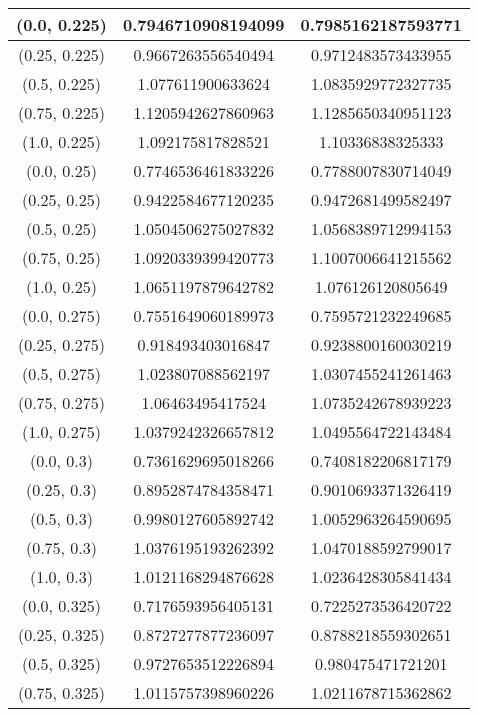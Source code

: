 \begin{table}[H]
\begin{tabular}{|c|c|c|}
\hline
(0.0, 0.225) & 0.7946710908194099 & 0.7985162187593771 \\
\hline
(0.25, 0.225) & 0.9667263556540494 & 0.9712483573433955 \\
\hline
(0.5, 0.225) & 1.077611900633624 & 1.0835929772327735 \\
\hline
(0.75, 0.225) & 1.1205942627860963 & 1.1285650340951123 \\
\hline
(1.0, 0.225) & 1.092175817828521 & 1.10336838325333 \\
\hline
\hline
(0.0, 0.25) & 0.7746536461833226 & 0.7788007830714049 \\
\hline
(0.25, 0.25) & 0.9422584677120235 & 0.9472681499582497 \\
\hline
(0.5, 0.25) & 1.0504506275027832 & 1.0568389712994153 \\
\hline
(0.75, 0.25) & 1.0920339399420773 & 1.1007006641215562 \\
\hline
(1.0, 0.25) & 1.0651197879642782 & 1.076126120805649 \\
\hline
\hline
(0.0, 0.275) & 0.7551649060189973 & 0.7595721232249685 \\
\hline
(0.25, 0.275) & 0.918493403016847 & 0.9238800160030219 \\
\hline
(0.5, 0.275) & 1.023807088562197 & 1.0307455241261463 \\
\hline
(0.75, 0.275) & 1.06463495417524 & 1.0735242678939223 \\
\hline
(1.0, 0.275) & 1.0379242326657812 & 1.0495564722143484 \\
\hline
\hline
(0.0, 0.3) & 0.7361629695018266 & 0.7408182206817179 \\
\hline
(0.25, 0.3) & 0.8952874784358471 & 0.9010693371326419 \\
\hline
(0.5, 0.3) & 0.9980127605892742 & 1.0052963264590695 \\
\hline
(0.75, 0.3) & 1.0376195193262392 & 1.0470188592799017 \\
\hline
(1.0, 0.3) & 1.0121168294876628 & 1.0236428305841434 \\
\hline
\hline
(0.0, 0.325) & 0.7176593956405131 & 0.7225273536420722 \\
\hline
(0.25, 0.325) & 0.8727277877236097 & 0.8788218559302651 \\
\hline
(0.5, 0.325) & 0.9727653512226894 & 0.980475471721201 \\
\hline
(0.75, 0.325) & 1.0115757398960226 & 1.0211678715362862 \\

\end{tabular}
\end{table}
